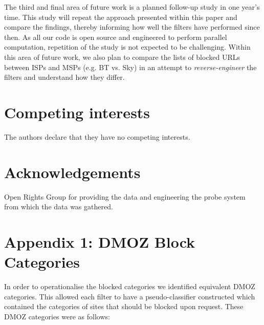 \documentclass{bmcart}
\begin{document}
The third and final area of future work is a planned follow-up study in one year's time.
This study will repeat the approach presented within this paper and compare the findings, thereby informing how well the filters have performed since then.
As all our code is open source and engineered to perform parallel computation, repetition of the study is not expected to be challenging.
Within this area of future work, we also plan to compare the lists of blocked URLs between ISPs and MSPs (e.g. BT vs. Sky) in an attempt to \emph{reverse-engineer} the filters and understand how they differ.


\begin{backmatter}

\section*{Competing interests}
The authors declare that they have no competing interests.

\section*{Acknowledgements}
Open Rights Group for providing the data and engineering the probe system from which the data was gathered.


\section*{Appendix 1: DMOZ Block Categories}
\label{app:cats}
In order to operationalise the blocked categories we identified equivalent DMOZ categories.
This allowed each filter to have a pseudo-classifier constructed which contained the categories of sites that should be blocked upon request.
These DMOZ categories were as follows:


\end{backmatter}
\end{document}
